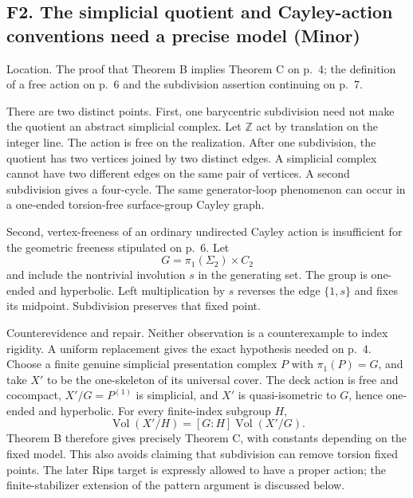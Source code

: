 \documentclass[10pt]{article}
\begin{document}
\subsection*{F2. The simplicial quotient and Cayley-action conventions need a precise model (Minor)}
Location. The proof that Theorem B implies Theorem C on p. 4; the definition of a free action on p. 6 and the subdivision assertion continuing on p. 7.\par
There are two distinct points. First, one barycentric subdivision need not make the quotient an abstract simplicial complex. Let \(\mathbb Z\) act by translation on the integer line. The action is free on the realization. After one subdivision, the quotient has two vertices joined by two distinct edges. A simplicial complex cannot have two different edges on the same pair of vertices. A second subdivision gives a four-cycle. The same generator-loop phenomenon can occur in a one-ended torsion-free surface-group Cayley graph.\par
Second, vertex-freeness of an ordinary undirected Cayley action is insufficient for the geometric freeness stipulated on p. 6. Let \[G=\pi_1(\Sigma_2)\times C_2\] and include the nontrivial involution \(s\) in the generating set. The group is one-ended and hyperbolic. Left multiplication by \(s\) reverses the edge \(\{1,s\}\) and fixes its midpoint. Subdivision preserves that fixed point.\par
Counterevidence and repair. Neither observation is a counterexample to index rigidity. A uniform replacement gives the exact hypothesis needed on p. 4. Choose a finite genuine simplicial presentation complex \(P\) with \(\pi_1(P)=G\), and take \(X'\) to be the one-skeleton of its universal cover. The deck action is free and cocompact, \(X'/G=P^{(1)}\) is simplicial, and \(X'\) is quasi-isometric to \(G\), hence one-ended and hyperbolic. For every finite-index subgroup \(H\), \[\operatorname{Vol}(X'/H)=[G:H]\operatorname{Vol}(X'/G).\] Theorem B therefore gives precisely Theorem C, with constants depending on the fixed model. This also avoids claiming that subdivision can remove torsion fixed points. The later Rips target is expressly allowed to have a proper action; the finite-stabilizer extension of the pattern argument is discussed below.\par
\end{document}
